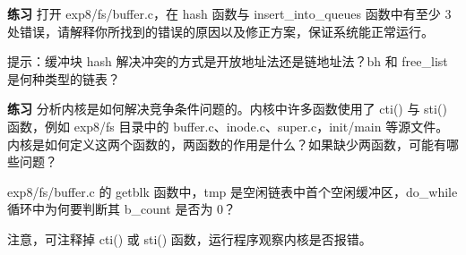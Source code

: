 \begin{mdframed}[hidealllines=true,backgroundcolor=gray!20]
\textbf{练习 }打开 exp8/fs/buffer.c，在 hash 函数与 insert\_into\_queues 函数中有至少 3 处错误，请解释你所找到的错误的原因以及修正方案，保证系统能正常运行。

提示：缓冲块 hash 解决冲突的方式是开放地址法还是链地址法？bh 和 free\_list 是何种类型的链表？
\end{mdframed}

\begin{mdframed}[hidealllines=true,backgroundcolor=gray!20]
\textbf{练习 }分析内核是如何解决竞争条件问题的。内核中许多函数使用了 cti() 与 sti() 函数，例如 exp8/fs 目录中的 buffer.c、inode.c、super.c，init/main 等源文件。内核是如何定义这两个函数的，两函数的作用是什么？如果缺少两函数，可能有哪些问题？

exp8/fs/buffer.c 的 getblk 函数中，tmp 是空闲链表中首个空闲缓冲区，do\_while 循环中为何要判断其 b\_count 是否为 0？

注意，可注释掉 cti() 或 sti() 函数，运行程序观察内核是否报错。
\end{mdframed}
